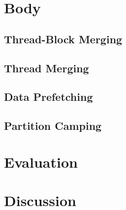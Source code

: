 \documentclass[conference]{IEEEtran}
\begin{document}
\section{Body}

	
	
	\subsection{Thread-Block Merging}
		
	
	\subsection{Thread Merging}
		
		
	\subsection{Data Prefetching}
		
		
	\subsection{Partition Camping}
		

\section{Evaluation}
	

\section{Discussion}

\end{document}
